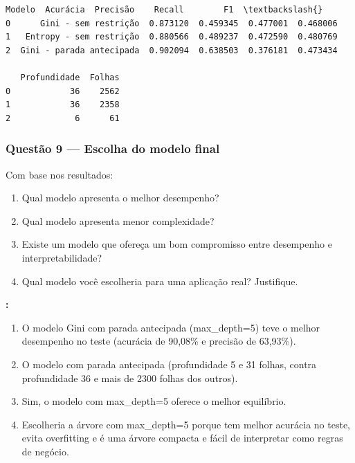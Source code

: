 \documentclass[11pt]{article}
\makeatletter
\providecommand{\tightlist}{%
      \setlength{\itemsep}{0pt}\setlength{\parskip}{0pt}}
\newcommand{\boxspacing}{\kern\kvtcb@left@rule\kern\kvtcb@boxsep}
\newcommand{\prompt}[4]{
        {\ttfamily\llap{{\color{#2}[#3]:\hspace{3pt}#4}}\vspace{-\baselineskip}}
    }
\makeatother
\begin{document}
            \begin{tcolorbox}[breakable, size=fbox, boxrule=.5pt, pad at break*=1mm, opacityfill=0]
\prompt{Out}{outcolor}{21}{\boxspacing}
\begin{Verbatim}[commandchars=\\\{\}]
                     Modelo  Acurácia  Precisão    Recall        F1  \textbackslash{}
0      Gini - sem restrição  0.873120  0.459345  0.477001  0.468006
1   Entropy - sem restrição  0.880566  0.489237  0.472590  0.480769
2  Gini - parada antecipada  0.902094  0.638503  0.376181  0.473434

   Profundidade  Folhas
0            36    2562
1            36    2358
2             6      61
\end{Verbatim}
\end{tcolorbox}
        
    \subsubsection{Questão 9 --- Escolha do modelo
final}\label{questuxe3o-9-escolha-do-modelo-final}

Com base nos resultados:

\begin{enumerate}
\def\labelenumi{\arabic{enumi}.}
\tightlist
\item
  Qual modelo apresenta o melhor desempenho?
\item
  Qual modelo apresenta menor complexidade?
\item
  Existe um modelo que ofereça um bom compromisso entre desempenho e
  interpretabilidade?
\item
  Qual modelo você escolheria para uma aplicação real? Justifique.
\end{enumerate}

\textbf{:}

    \begin{enumerate}
\def\labelenumi{\arabic{enumi}.}
\tightlist
\item
  O modelo Gini com parada antecipada (max\_depth=5) teve o melhor
  desempenho no teste (acurácia de 90,08\% e precisão de 63,93\%).
\item
  O modelo com parada antecipada (profundidade 5 e 31 folhas, contra
  profundidade 36 e mais de 2300 folhas dos outros).
\item
  Sim, o modelo com max\_depth=5 oferece o melhor equilíbrio.
\item
  Escolheria a árvore com max\_depth=5 porque tem melhor acurácia no
  teste, evita overfitting e é uma árvore compacta e fácil de
  interpretar como regras de negócio.
\end{enumerate}
\end{document}
